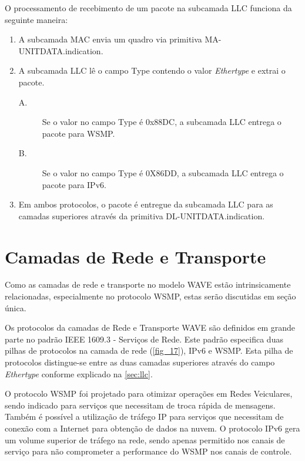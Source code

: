 \documentclass[
12pt,				%
openright,			%
oneside,			%
a4paper,			%
brazil,				%
]{abntex2}
\begin{document}
	\par O processamento de recebimento de um pacote na subcamada LLC funciona da seguinte maneira: 
	\begin{enumerate}
		\item A subcamada MAC envia um quadro via primitiva MA-UNITDATA.indication.
		\item A subcamada LLC lê o campo Type contendo o valor \textit{Ethertype} e extrai o pacote.
		\begin{description}
			\item[A.] Se o valor no campo Type é 0x88DC, a subcamada LLC entrega o pacote para WSMP.
			\item[B.] Se o valor no campo Type é 0X86DD, a subcamada LLC entrega o pacote para IPv6.
		\end{description}
		\item Em ambos protocolos, o pacote é entregue da subcamada LLC para as camadas superiores através da primitiva DL-UNITDATA.indication.	
	\end{enumerate}
	
	\section{Camadas de Rede e Transporte}
	
	\par Como as camadas de rede e transporte no modelo WAVE estão intrinsicamente relacionadas, especialmente no protocolo WSMP, estas serão discutidas em seção única.
	
	\par Os protocolos da camadas de Rede e Transporte WAVE são definidos em grande parte no padrão IEEE 1609.3 - Serviços de Rede. Este padrão especifica duas pilhas de protocolos na camada de rede (\autoref{fig_17}), IPv6 e WSMP. Esta pilha de protocolos distingue-se entre as duas camadas superiores através do campo \textit{Ethertype} conforme explicado na \autoref{sec:llc}.
	
	\par O protocolo WSMP foi projetado para otimizar operações em Redes Veiculares, sendo indicado para serviços que necessitam de troca rápida de mensagens. Também é possível a utilização de tráfego IP para serviços que necessitam de conexão com a Internet para obtenção de dados na nuvem. O protocolo IPv6 gera um volume superior de tráfego na rede, sendo apenas permitido nos canais de serviço para não comprometer a performance do WSMP nos canais de controle.
	
\end{document}
